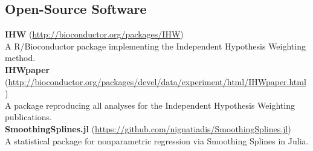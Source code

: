 \documentclass[margin,line]{res}
\begin{document}
\begin{resume}
\section{\sc Open-Source Software}
\textbf{IHW} (\url{http://bioconductor.org/packages/IHW})\\ A R/Bioconductor package implementing the Independent Hypothesis Weighting method. \\
\textbf{IHWpaper} (\url{http://bioconductor.org/packages/devel/data/experiment/html/IHWpaper.html})\\
A package reproducing all analyses for the Independent Hypothesis Weighting publications.\\
\textbf{SmoothingSplines.jl} (\url{https://github.com/nignatiadis/SmoothingSplines.jl})\\
A statistical package for nonparametric regression via Smoothing Splines in Julia.

\end{resume}
\end{document}
